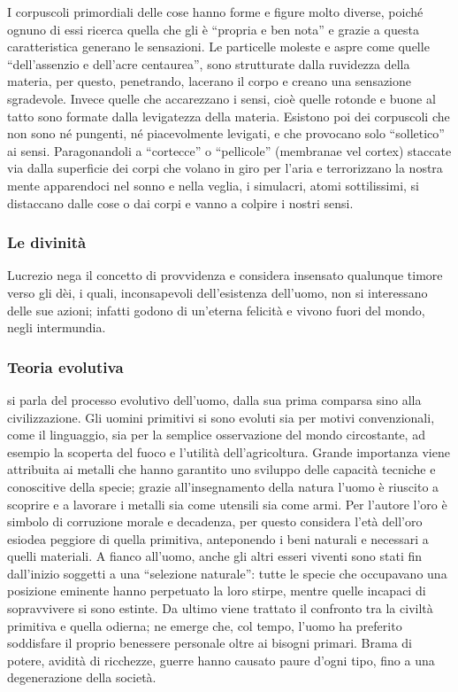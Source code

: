 \documentclass[10pt,a4paper]{article}
\begin{document}
	I corpuscoli primordiali delle cose hanno forme e figure molto diverse, poiché ognuno di essi ricerca quella che gli è “propria e ben nota” e grazie a questa caratteristica generano le sensazioni. Le particelle moleste e aspre come quelle “dell'assenzio e dell'acre centaurea”, sono strutturate dalla ruvidezza della materia, per questo, penetrando, lacerano il corpo e creano una sensazione sgradevole. Invece quelle che accarezzano i sensi, cioè quelle rotonde e buone al tatto sono formate dalla levigatezza della materia. Esistono poi dei corpuscoli che non sono né pungenti, né piacevolmente levigati, e che provocano solo “solletico” ai sensi. Paragonandoli a “cortecce” o “pellicole” (membranae vel cortex) staccate via dalla superficie dei corpi che volano in giro per l'aria e terrorizzano la nostra mente apparendoci nel sonno e nella veglia, i simulacri, atomi sottilissimi, si distaccano dalle cose o dai corpi e vanno a colpire i nostri sensi.
	
	\subsubsection{Le divinità}
	
	 Lucrezio nega il concetto di provvidenza e considera insensato qualunque timore verso gli dèi, i quali, inconsapevoli dell'esistenza dell'uomo, non si interessano delle sue azioni; infatti godono di un'eterna felicità e vivono fuori del mondo, negli intermundia.
	
	\subsubsection{Teoria evolutiva}
	
	 si parla del processo evolutivo dell'uomo, dalla sua prima comparsa sino alla civilizzazione. Gli uomini primitivi si sono evoluti sia per motivi convenzionali, come il linguaggio, sia per la semplice osservazione del mondo circostante, ad esempio la scoperta del fuoco e l'utilità dell'agricoltura. Grande importanza viene attribuita ai metalli che hanno garantito uno sviluppo delle capacità tecniche e conoscitive della specie; grazie all'insegnamento della natura l'uomo è riuscito a scoprire e a lavorare i metalli sia come utensili sia come armi. Per l'autore l'oro è simbolo di corruzione morale e decadenza, per questo considera l'età dell'oro esiodea peggiore di quella primitiva, anteponendo i beni naturali e necessari a quelli materiali. A fianco all'uomo, anche gli altri esseri viventi sono stati fin dall'inizio soggetti a una “selezione naturale”: tutte le specie che occupavano una posizione eminente hanno perpetuato la loro stirpe, mentre quelle incapaci di sopravvivere si sono estinte. Da ultimo viene trattato il confronto tra la civiltà primitiva e quella odierna; ne emerge che, col tempo, l'uomo ha preferito soddisfare il proprio benessere personale oltre ai bisogni primari. Brama di potere, avidità di ricchezze, guerre hanno causato paure d'ogni tipo, fino a una degenerazione della società.
	 
\end{document}
